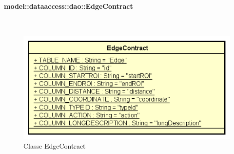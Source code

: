 \documentclass[../DefinizioneDiProdotto.tex]{subfiles}
\begin{document}
\paragraph{model::dataaccess::dao::EdgeContract}
\
\begin{figure}[H]
	\centering
	\includegraphics[width=\maxwidth]{img/EdgeContract.png}
	\caption{Classe EdgeContract}\label{fig:model::dataaccess::dao::EdgeContract} 
\end{figure}
\end{document}
